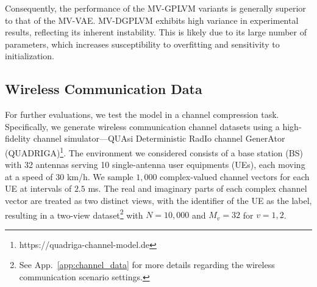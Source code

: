 Consequently, the performance of the MV-GPLVM variants is generally superior to that of the MV-VAE. %
 MV-DGPLVM exhibits high variance in experimental results, reflecting its inherent instability. This is likely due to its large number of parameters, which increases susceptibility to overfitting and sensitivity to initialization.




\vspace{-0.09in}
\subsection{Wireless Communication Data}
\label{subsec: wireless}
\vspace{-0.09in}

For further evaluations, %
we test the model in a channel compression task. Specifically, we generate wireless communication channel datasets using a high-fidelity channel simulator—\MakeUppercase{qua}si \MakeUppercase{d}eterministic \MakeUppercase{r}ad\MakeUppercase{i}o channel \MakeUppercase{g}ener\MakeUppercase{a}tor (\MakeUppercase{quadriga})\footnote{https://quadriga-channel-model.de}. The %
environment we considered consists of a base station (\MakeUppercase{bs}) with 32 antennas serving 10 single-antenna user equipments (\MakeUppercase{ue}s), each moving at a speed of 30 km/h. We sample $1,000$ complex-valued channel vectors for each \MakeUppercase{ue} at intervals of $2.5$ ms. The real and imaginary parts of each complex channel vector are treated as two distinct views, with the identifier of the \MakeUppercase{ue} as the label, resulting in a two-view dataset\footnote{See App.~\ref{app:channel_data} for more details regarding the wireless communication scenario settings.} with $N = 10,000$ and $M_v = 32$ for $v = 1, 2$.

